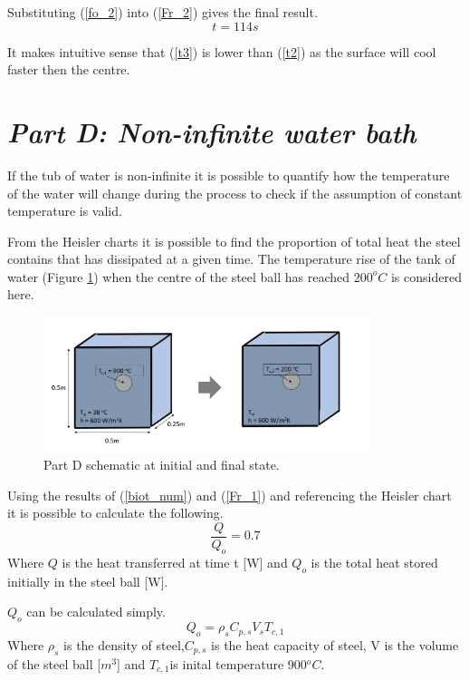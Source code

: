 \documentclass[11pt]{article}
\begin{document}
Substituting (\ref{fo_2}) into (\ref{Fr_2}) gives the final result.
\begin{equation}\label{t3}
	t = 114s
\end{equation}

It makes intuitive sense that (\ref{t3}) is lower than (\ref{t2}) as the surface will cool faster then the centre.

\section{\emph{Part D: Non-infinite water bath}}
If the tub of water is non-infinite it is possible to quantify how the temperature of the water will change during the process to check if the assumption of constant temperature is valid. 

From the Heisler charts it is possible to find the proportion of total heat the steel contains that has dissipated at a given time. The temperature rise of the tank of water (Figure \ref{fig:schem_d}) when the centre of the steel ball has reached $200^{o}C$ is considered here.
\begin{figure}[!htbp]
	\centering
	\includegraphics[width=0.85\textwidth]{part_d_fig}
	\caption{Part D schematic at initial and final state.}
	\label{fig:schem_d}
\end{figure}

Using the results of (\ref{biot_num}) and (\ref{Fr_1}) and referencing the Heisler chart \cite{bergman_fundamentals_2011} it is possible to calculate the following.
\begin{equation}\label{q_ratio}
	\frac{Q}{Q_o} = 0.7
\end{equation}
Where $Q$ is the heat transferred at time t [W] and $Q_o$ is the total heat stored initially in the steel ball [W].

$Q_o$ can be calculated simply.
\begin{equation}\label{q_o}
	Q_o = \rho_s C_{p,s} V_s T_{c,1}
\end{equation}
Where $\rho_s$ is the density of steel,$C_{p,s}$ is the heat capacity of steel, V is the volume of the steel ball [$m^3$] and $T_{c,1} $is inital temperature 900$^oC$.
\end{document}
